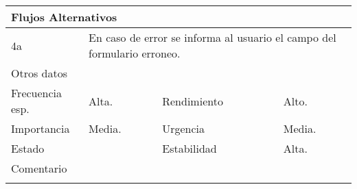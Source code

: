 \documentclass{article}
\begin{document}
\begin{table}[h]
\begin{tabular}{|l|l|l|l|l|l|}
\hline
\multicolumn{6}{|p{10cm}|}{Flujos Alternativos}\\
\hline
\multicolumn{1}{|p{1cm}}{4a} & \multicolumn{5}{|p{9cm}|}{En caso de error se informa al usuario el campo del formulario erroneo.}\\
\hline
\multicolumn{6}{|p{10cm}|}{Otros datos}\\
\hline
\multicolumn{1}{|p{2cm}|}{Frecuencia esp.} & \multicolumn{2}{p{3cm}}{Alta.} & \multicolumn{1}{|p{2cm}|}{Rendimiento} & \multicolumn{2}{p{3cm}|}{Alto.}\\
\hline
\multicolumn{1}{|p{2cm}|}{Importancia} & \multicolumn{2}{p{3cm}}{Media.} & \multicolumn{1}{|p{2cm}|}{Urgencia} & \multicolumn{2}{p{3cm}|}{Media.}\\
\hline
\multicolumn{1}{|p{2cm}|}{Estado} & \multicolumn{2}{p{3cm}}{} & \multicolumn{1}{|p{2cm}|}{Estabilidad} & \multicolumn{2}{p{3cm}|}{Alta.}\\
\hline
\multicolumn{6}{|p{10cm}|}{Comentario}\\
\hline
\multicolumn{6}{|p{10cm}|}{}\\
\hline
\end{tabular}
\end{table}
\addtocounter{ni}{1}
\end{document}
